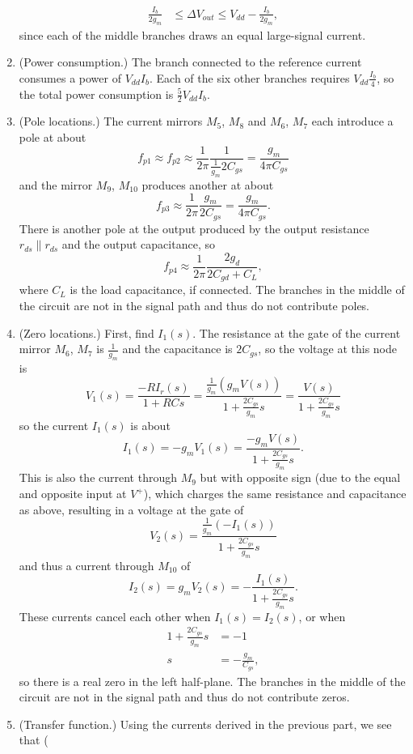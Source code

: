 \documentclass{article}
\begin{document}
\begin{enumerate}
{\begin{align*}
        \frac{I_b}{2g_m} &\leq \Delta V_{out} \leq V_{dd} - \frac{I_b}{2g_m},
        \end{align*}
        since each of the middle branches draws an equal large-signal current.
       }
  \item{(Power consumption.)
        The branch connected to the reference current consumes a power of 
        $V_{dd} I_b$. Each of the six other branches requires 
        $V_{dd} \frac{I_b}{4}$, so the total power consumption is 
        $\frac{5}{2} V_{dd} I_b.$
       }
  \item{(Pole locations.)
       The current mirrors $M_5$, $M_8$ and $M_6$, $M_7$ each introduce a pole
       at about
       $$
       f_{p1} \approx f_{p2} \approx 
       \frac{1}{2 \pi} \frac{1}{\frac{1}{g_m} 2 C_{gs}} = \frac{g_m}{4 \pi C_{gs}}
       $$
       and the mirror $M_9$, $M_{10}$ produces another at about
       $$
       f_{p3} \approx \frac{1}{2 \pi}\frac{g_m}{2C_{gs}} = \frac{g_m}{4 \pi C_{gs}}.
       $$
       There is another pole at the output produced by the output resistance
       $r_{ds} \| r_{ds}$ and the output capacitance, so
       $$
       f_{p4} \approx \frac{1}{2\pi}\frac{2g_d}{2C_{gd} + C_L},
       $$
       where $C_L$ is the load capacitance, if connected.
       The branches in the middle of the circuit are not in the signal path
       and thus do not contribute poles.
       }
  \item{(Zero locations.)
        First, find $I_1(s)$. The resistance at the gate of the current mirror
        $M_6$, $M_7$ is $\frac{1}{g_m}$ and the capacitance is $2 C_{gs}$, so 
        the voltage at this node is 
        $$
        V_1(s) = \frac{-R I_r(s)}{1 + RCs} 
               = \frac{\frac{1}{g_m} (g_m V(s))}{1 + \frac{2 C_{gs}}{g_m} s}
               = \frac{V(s)}{1 + \frac{2 C_{gs}}{g_m} s}
        $$
        so the current $I_1(s)$ is about
        $$
        I_1(s) = -g_m V_1(s) = \frac{-g_m V(s)}{1 + \frac{2 C_{gs}}{g_m} s}.
        $$
        This is also the current through $M_9$ but with opposite sign 
        (due to the equal and opposite input at $V^{+}$), which 
        charges the same resistance and capacitance as above, resulting in a
        voltage at the gate of
        $$
        V_2(s) = \frac{\frac{1}{g_m} (-I_1(s))}{1 + \frac{2 C_{gs}}{g_m} s}
        $$ 
        and thus a current through $M_{10}$ of
        $$
        I_2(s) = g_m V_2(s) = -\frac{I_1(s)}{1 + \frac{2 C_{gs}}{g_m} s}.
        $$
        These currents cancel each other when $I_1(s) = I_2(s)$, or when
        \begin{align*}
          1 + \frac{2 C_{gs}}{g_m} s &= -1 \\
          s &= -\frac{g_m}{C_{gs}},
        \end{align*}
        so there is a real zero in the left half-plane.
        The branches in the middle of the circuit are not in the signal path
        and thus do not contribute zeros.
       }
  \item{(Transfer function.)
       Using the currents derived in the previous part, we see that
       (

}
\end{enumerate}
\end{document}
